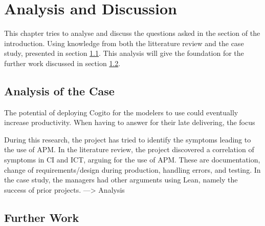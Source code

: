 \chapter{Analysis and Discussion}
This chapter tries to analyse and discuss the questions asked in the  section of the introduction. Using knowledge from both the litterature review and the case study, presented in section \ref{sec:analysis}. This analysis will give the foundation for the further work discussed in section \ref{sec:further_work}. 
\section{Analysis of the Case} \label{sec:analysis}

The potential of deploying Cogito for the modelers to use could eventually increase productivity. When having to answer for their late delivering, the focus  


During this research, the project has tried to identify the symptoms leading to the use of APM. In the literature review, the project discovered a correlation of symptoms in CI and ICT, arguing for the use of APM. These are documentation, change of requirements/design during production, handling errors, and testing. In the case study, the managers had other arguments using Lean, namely the success of prior projects. ---> Analysis
\section{Further Work} \label{sec:further_work}

\cleardoublepage